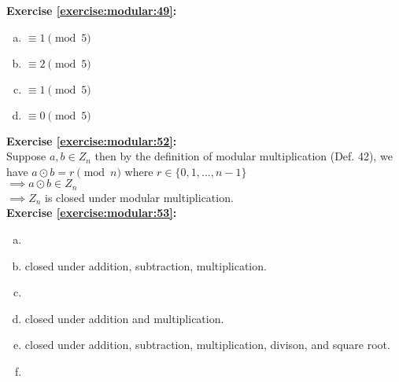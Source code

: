 \noindent\textbf{Exercise \ref{exercise:modular:49}:} 
\begin{enumerate}[(a)]
\item
$\equiv 1 \pmod{5}$

\item
$\equiv 2 \pmod{5}$

\item
$\equiv 1 \pmod{5}$

\item
$\equiv 0 \pmod{5}$
\end{enumerate}

\noindent\textbf{Exercise \ref{exercise:modular:52}:}\\
Suppose $a,b \in Z_n$ then by the definition of modular multiplication (Def. 42), we have $a \odot b =r \pmod{n}$ where $r \in \{0,1,...,n-1\}$\\
$\implies a \odot b \in Z_n$\\
$\implies Z_n$ is closed under modular multiplication.\\

\noindent\textbf{Exercise \ref{exercise:modular:53}:} 
\begin{enumerate}[(a)]
\item

\item
closed under addition, subtraction, multiplication.

\item

\item
closed under addition and multiplication.

\item
closed under addition, subtraction, multiplication, divison, and square root.
\item
\end{enumerate}

